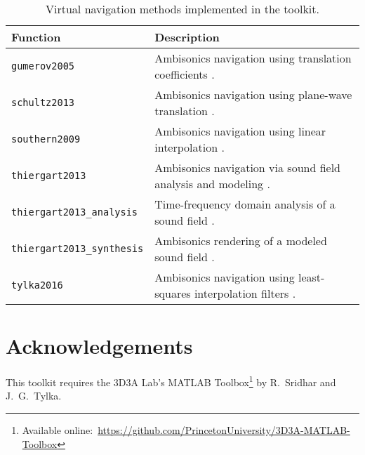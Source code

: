 \documentclass[11pt, oneside]{article}
\begin{document}
\begin{table}
\centering
  \begin{tabular}{| l | p{11cm} |}
    \hline
    \textbf{Function} & \textbf{Description} \\ \hline
    \texttt{gumerov2005} & Ambisonics navigation using translation coefficients \citep{GumerovDuraiswami2005,Zotter2009PhD}. \\ \hline
    \texttt{schultz2013} & Ambisonics navigation using plane-wave translation \citep{SchultzSpors2013}. \\ \hline
    \texttt{southern2009} & Ambisonics navigation using linear interpolation \citep{Southern2009}. \\ \hline
    \texttt{thiergart2013} & Ambisonics navigation via sound field analysis and modeling \citep{Thiergart2013}. \\ \hline
    \texttt{thiergart2013\_analysis} & Time-frequency domain analysis of a sound field \citep{Thiergart2013}. \\ \hline
    \texttt{thiergart2013\_synthesis} & Ambisonics rendering of a modeled sound field \citep{Thiergart2013}. \\ \hline
    \texttt{tylka2016} & Ambisonics navigation using least-squares interpolation filters \citep{TylkaChoueiri2016}. \\ \hline
    \end{tabular}
    \caption{Virtual navigation methods implemented in the toolkit.}
    \label{tab:Methods}
\end{table}

\section*{Acknowledgements}
This toolkit requires the 3D3A Lab's MATLAB Toolbox\footnote{Available online:~\url{https://github.com/PrincetonUniversity/3D3A-MATLAB-Toolbox}}
by R.~Sridhar and J.~G.~Tylka.



\end{document}
